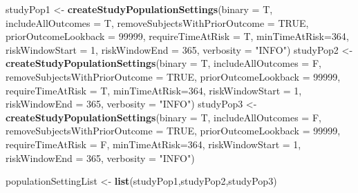 \documentclass[]{article}
\newenvironment{Shaded}{\begin{snugshade}}{\end{snugshade}}
\newcommand{\KeywordTok}[1]{\textcolor[rgb]{0.13,0.29,0.53}{\textbf{#1}}}
\newcommand{\DataTypeTok}[1]{\textcolor[rgb]{0.13,0.29,0.53}{#1}}
\newcommand{\DecValTok}[1]{\textcolor[rgb]{0.00,0.00,0.81}{#1}}
\newcommand{\StringTok}[1]{\textcolor[rgb]{0.31,0.60,0.02}{#1}}
\newcommand{\OtherTok}[1]{\textcolor[rgb]{0.56,0.35,0.01}{#1}}
\newcommand{\NormalTok}[1]{#1}
\begin{document}
\begin{Shaded}
\begin{Highlighting}[]
\NormalTok{studyPop1 <-}\StringTok{ }\KeywordTok{createStudyPopulationSettings}\NormalTok{(}\DataTypeTok{binary =}\NormalTok{ T,}
                                          \DataTypeTok{includeAllOutcomes =}\NormalTok{ T,}
                                          \DataTypeTok{removeSubjectsWithPriorOutcome =} \OtherTok{TRUE}\NormalTok{,}
                                          \DataTypeTok{priorOutcomeLookback =} \DecValTok{99999}\NormalTok{,}
                                          \DataTypeTok{requireTimeAtRisk =}\NormalTok{ T,}
                                          \DataTypeTok{minTimeAtRisk=}\DecValTok{364}\NormalTok{,}
                                          \DataTypeTok{riskWindowStart =} \DecValTok{1}\NormalTok{,}
                                          \DataTypeTok{riskWindowEnd =} \DecValTok{365}\NormalTok{,}
                                          \DataTypeTok{verbosity =} \StringTok{"INFO"}\NormalTok{)}
\NormalTok{studyPop2 <-}\StringTok{ }\KeywordTok{createStudyPopulationSettings}\NormalTok{(}\DataTypeTok{binary =}\NormalTok{ T,}
                                           \DataTypeTok{includeAllOutcomes =}\NormalTok{ F,}
                                           \DataTypeTok{removeSubjectsWithPriorOutcome =} \OtherTok{TRUE}\NormalTok{,}
                                           \DataTypeTok{priorOutcomeLookback =} \DecValTok{99999}\NormalTok{,}
                                           \DataTypeTok{requireTimeAtRisk =}\NormalTok{ T,}
                                           \DataTypeTok{minTimeAtRisk=}\DecValTok{364}\NormalTok{,}
                                           \DataTypeTok{riskWindowStart =} \DecValTok{1}\NormalTok{,}
                                           \DataTypeTok{riskWindowEnd =} \DecValTok{365}\NormalTok{,}
                                           \DataTypeTok{verbosity =} \StringTok{"INFO"}\NormalTok{)}
\NormalTok{studyPop3 <-}\StringTok{ }\KeywordTok{createStudyPopulationSettings}\NormalTok{(}\DataTypeTok{binary =}\NormalTok{ T,}
                                           \DataTypeTok{includeAllOutcomes =}\NormalTok{ F,}
                                           \DataTypeTok{removeSubjectsWithPriorOutcome =} \OtherTok{TRUE}\NormalTok{,}
                                           \DataTypeTok{priorOutcomeLookback =} \DecValTok{99999}\NormalTok{,}
                                           \DataTypeTok{requireTimeAtRisk =}\NormalTok{ F,}
                                           \DataTypeTok{minTimeAtRisk=}\DecValTok{364}\NormalTok{,}
                                           \DataTypeTok{riskWindowStart =} \DecValTok{1}\NormalTok{,}
                                           \DataTypeTok{riskWindowEnd =} \DecValTok{365}\NormalTok{,}
                                           \DataTypeTok{verbosity =} \StringTok{"INFO"}\NormalTok{)}
                                           
\NormalTok{populationSettingList <-}\StringTok{ }\KeywordTok{list}\NormalTok{(studyPop1,studyPop2,studyPop3)}
\end{Highlighting}
\end{Shaded}
\end{document}
